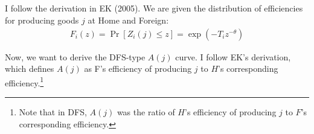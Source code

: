 \documentclass[12pt]{article}
\begin{document}
\subsection{}
I follow the derivation in EK (2005). We are given the distribution of efficiencies for producing goods $j$ at Home and Foreign:
\begin{align*}
F_i(z)=\Pr[Z_i(j) \leq z ] = \exp(-T_iz^{-\theta})
\end{align*}

\iffalse
Now, if we pick some random $j \in [0,1]$, the probability distribution of its efficiency, $Z_i(j)$, is obviously same as above. Accordingly, we can order goods such that
\begin{align*}
j &= \exp(-T_iz_i(j)^{-\theta})\\
\implies z_i(j) &= \left(-\frac{T_i}{\ln j}\right)^{-1/\theta}.
\end{align*}
(Essentially, think of the index $j$ as the vertical axis of the CDF above).\\
\fi


Now, we want to derive the DFS-type $A(j)$ curve. I follow EK's derivation, which defines $A(j)$ as F's efficiency of producing $j$ to $H$'s corresponding efficiency.\footnote{Note that in DFS, $A(j)$ was the ratio of $H$'s efficiency of producing $j$ to $F$'s corresponding efficiency.} \\
\end{document}
